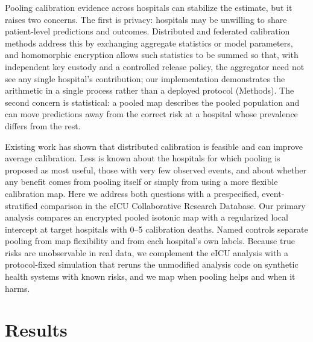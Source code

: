 \documentclass[11pt]{article}
\begin{document}
Pooling calibration evidence across hospitals can stabilize the estimate, but it raises two concerns. The first is privacy: hospitals may be unwilling to share patient-level predictions and outcomes. Distributed and federated calibration methods address this by exchanging aggregate statistics or model parameters\cite{r4,r5,r16,r6,r20}, and homomorphic encryption allows such statistics to be summed so that, with independent key custody and a controlled release policy, the aggregator need not see any single hospital's contribution\cite{r18,r7,r8}; our implementation demonstrates the arithmetic in a single process rather than a deployed protocol (Methods). The second concern is statistical: a pooled map describes the pooled population and can move predictions away from the correct risk at a hospital whose prevalence differs from the rest.

Existing work has shown that distributed calibration is feasible and can improve average calibration\cite{r4,r5,r6}. Less is known about the hospitals for which pooling is proposed as most useful, those with very few observed events, and about whether any benefit comes from pooling itself or simply from using a more flexible calibration map. Here we address both questions with a prespecified, event-stratified comparison in the eICU Collaborative Research Database\cite{r1,r2}. Our primary analysis compares an encrypted pooled isotonic map with a regularized local intercept at target hospitals with 0--5 calibration deaths. Named controls separate pooling from map flexibility and from each hospital's own labels. Because true risks are unobservable in real data, we complement the eICU analysis with a protocol-fixed simulation that reruns the unmodified analysis code on synthetic health systems with known risks, and we map when pooling helps and when it harms.

\section*{Results}
\end{document}
